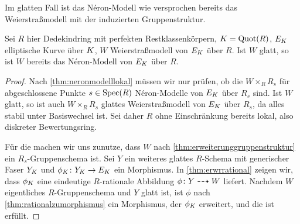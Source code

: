 Im glatten Fall ist das Néron-Modell wie versprochen bereits das
Weierstraßmodell mit der induzierten Gruppenstruktur.
\begin{Korollar}\label{thm:neronmausweierstrassgl}
  Sei $R$ hier Dedekindring mit perfekten Restklassenkörpern, $K=\operatorname{Quot}(R)$,
  $E_{K}$ elliptische Kurve über $K$, $W$ Weierstraßmodell von $E_{K}$
  über $R$.
  Ist $W$ glatt, so ist $W$ bereits das Néron-Modell von $E_{K}$ über
  $R$.
  \begin{proof}
    Nach \ref{thm:neronmodelllokal} müssen wir nur prüfen, ob die 
    $W\times_R R_s$ für abgeschlossene Punkte $s\in\operatorname{Spec}(R)$
    Néron-Modelle von $E_{K}$ über $R_s$ sind.
    Ist $W$ glatt, so ist auch $W\times_R R_s$ glattes
    Weierstraßmodell von $E_{K}$ über $R_s$, da alles stabil unter
    Basiswechsel ist.
    Sei daher $R$ ohne Einschränkung bereits lokal, also diskreter
    Bewertungsring.
    

    Für die \NAbbEig machen wir uns zunutze, dass $W$ nach
    \ref{thm:erweiterunggruppenstruktur} ein $R_s$-Gruppenschema ist.
    Sei $Y$ ein weiteres glattes $R$-Schema mit generischer Faser
    $Y_{K}$ und $\phi_{K}\colon Y_{K}\to E_{K}$ ein Morphismus.
    In \ref{thm:erwrrational} zeigen wir, dass $\phi_{K}$ eine
    eindeutige $R$-rationale Abbildung $\phi\colon Y\dashrightarrow W$ liefert.
    Nachdem $W$ eigentliches $R$-Gruppenschema und $Y$ glatt ist, ist
    $\phi$ nach \ref{thm:rationalzumorphismus} ein Morphismus, der
    $\phi_{K}$ erweitert, und die \NAbbEig ist erfüllt.
  \end{proof}
\end{Korollar}

